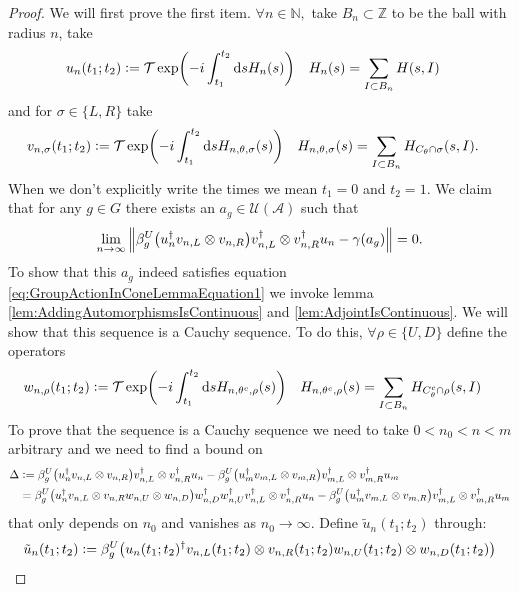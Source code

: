 \documentclass[12pt,a4paper,twoside]{article}
\renewcommand{\d}{\text{d}}
\newcommand{\defeq}{\vcentcolon=}
\let\originalleft\left
\let\originalright\right
\renewcommand{\left}{\mathopen{}\mathclose\bgroup\originalleft}
\renewcommand{\right}{\aftergroup\egroup\originalright}
\newcommand{\UU}{\mathcal U}
\newcommand{\ZZ}{\mathbb Z}
\renewcommand{\AA}{\mathcal A}
\newcommand{\NN}{\mathbb{N}}
\theoremstyle{definition}
\numberwithin{equation}{section}
\begin{document}
 \begin{proof}
 	We will first prove the first item.  $\forall n\in\NN,$ take $B_n\subset\ZZ$ to be the ball with radius $n$, take
 	\begin{align}
 		u_n(t_1;t_2)&\defeq \mathcal{T}\exp(-i\int_{t_1}^{t_2} \d s H_n(s))&H_n(s)&=\sum_{I\subset B_n}H(s,I)
 	\end{align}
 	and for $\sigma\in\{L,R\}$ take
 	\begin{align}
 		v_{n,\sigma}(t_1;t_2)&\defeq \mathcal{T}\exp(-i\int_{t_1}^{t_2} \d s H_{n,\theta,\sigma}(s))&H_{n,\theta,\sigma}(s)&=\sum_{I\subset B_n}H_{C_\theta\cap\sigma}(s,I).
 	\end{align}
 	When we don't explicitly write the times we mean $t_1=0$ and $t_2=1$. We claim that for any $g\in G$ there exists an $a_g\in\UU(\AA)$ such that
 	\begin{equation}
 		\lim_{n\rightarrow\infty}\norm{\beta_g^U\left(u_n^\dagger v_{n,L}\otimes v_{n,R}\right)v_{n,L}^\dagger\otimes v_{n,R}^\dagger u_{n}-\gamma(a_g)}=0.
 	\end{equation}
 	To show that this $a_g$ indeed satisfies equation \eqref{eq:GroupActionInConeLemmaEquation1} we invoke lemma \ref{lem:AddingAutomorphismsIsContinuous} and \ref{lem:AdjointIsContinuous}. We will show that this sequence is a Cauchy sequence. To do this, $\forall\rho\in\{U,D\}$ define the operators
 	\begin{align}
 		w_{n,\rho}(t_1;t_2)&\defeq \mathcal{T}\exp(-i\int_{t_1}^{t_2} \d s H_{n,\theta^c,\rho}(s))&H_{n,\theta^c,\rho}(s)&=\sum_{I\subset B_n}H_{C_\theta^c\cap\rho}(s,I)
 	\end{align}
 	To prove that the sequence is a Cauchy sequence we need to take $0<n_0<n<m$ arbitrary and we need to find a bound on
 	\begin{align}
 	\Delta&\defeq \beta_g^U\left(u_n^\dagger v_{n,L}\otimes v_{n,R}\right)v_{n,L}^\dagger\otimes v_{n,R}^\dagger u_{n}-\beta_g^U\left(u_m^\dagger v_{m,L}\otimes v_{m,R}\right)v_{m,L}^\dagger\otimes v_{m,R}^\dagger u_{m}\\
 	&= \beta_g^U\left(u_n^\dagger v_{n,L}\otimes v_{n,R}w_{n,U}\otimes w_{n,D}\right)w_{n,D}^\dagger w_{n,U}^\dagger v_{n,L}^\dagger\otimes v_{n,R}^\dagger u_{n}-\beta_g^U\left(u_m^\dagger v_{m,L}\otimes v_{m,R}\right)v_{m,L}^\dagger\otimes v_{m,R}^\dagger u_{m}
 	\end{align}
 	that only depends on $n_0$ and vanishes as $n_0\rightarrow\infty.$ Define $\tilde{u}_n(t_1;t_2)$ through:
 	\begin{align}
 		\tilde{u}_n(t_1;t_2)&\defeq \beta_g^U\left(u_n(t_1;t_2)^\dagger v_{n,L}(t_1;t_2)\otimes v_{n,R}(t_1;t_2)w_{n,U}(t_1;t_2)\otimes w_{n,D}(t_1;t_2)\right)\\

\end{align}
\end{proof}
\end{document}

